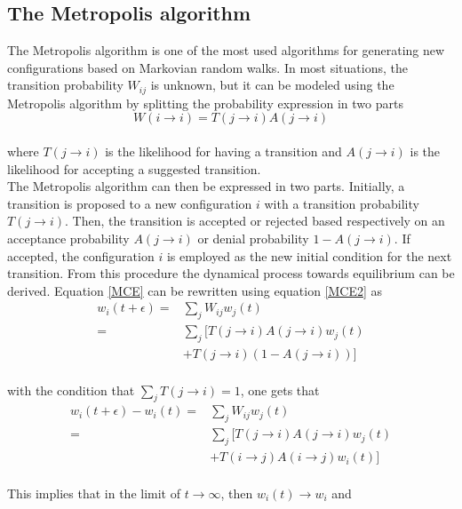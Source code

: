 \documentclass[%
reprint,nofootinbib,
amsmath,amssymb,
aps,
]{revtex4-1}
\begin{document}
\subsection*{The Metropolis algorithm} \noindent 
The Metropolis algorithm is one of the most used algorithms for generating new configurations based on Markovian random walks. In most situations, the transition probability $W_{ij}$ is unknown, but it can be modeled using the Metropolis algorithm by splitting the probability expression in two parts \\ 
\begin{equation}\label{MCE2}
	W(i\rightarrow i) = T(j\rightarrow i)A(j\rightarrow i)
\end{equation} \\ 
where $T(j\rightarrow i)$ is the likelihood for having a transition and $A(j\rightarrow i)$ is the likelihood for accepting a suggested transition. \\
The Metropolis algorithm can then be expressed in two parts. Initially, a transition is proposed to a new configuration $i$ with a transition probability $T(j\rightarrow i)$. Then, the transition is accepted or rejected based respectively on an acceptance probability $A(j \rightarrow i)$ or denial probability $1-A(j \rightarrow i)$. If accepted, the configuration $i$ is employed as the new initial condition for the next transition. From this procedure the dynamical process towards equilibrium can be derived. Equation \ref{MCE} can be rewritten using equation \ref{MCE2} as \\ 
\begin{align}
	w_i(t+\epsilon) =& \sum_j W_{ij}w_j(t) \nonumber\\ =& \sum_j [T(j\rightarrow i)A(j\rightarrow i)w_j(t) \nonumber\\&+ T(j\rightarrow i)(1-A(j\rightarrow i))]
\end{align} \\ 
with the condition that $\sum_j T(j\rightarrow i) = 1$, one gets that \\ 
\begin{align}
w_i(t+\epsilon) - w_i(t) =& \sum_j W_{ij}w_j(t)  \nonumber\\ =  & \sum_j [T(j\rightarrow i)A(j\rightarrow i)w_j(t) \nonumber \\ &+ T(i\rightarrow j)A(i\rightarrow j)w_i(t)]
\end{align} \\ 
This implies that in the limit of $t\rightarrow \infty$, then $w_i(t) \rightarrow w_i$ and \\
\end{document}
